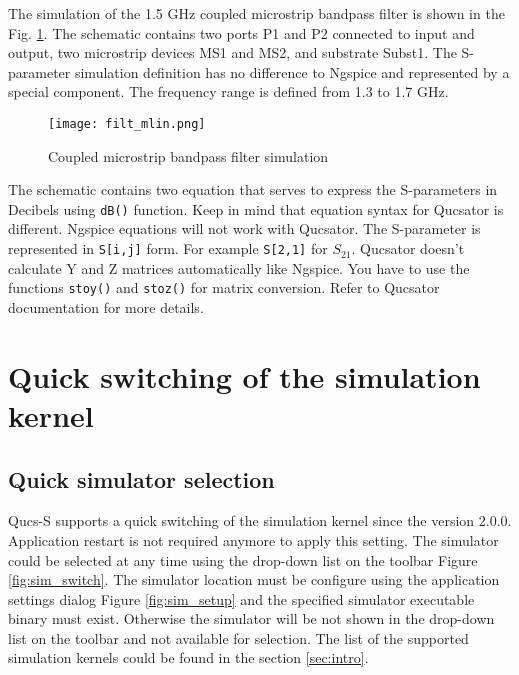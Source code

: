 The simulation of the 1.5 GHz coupled microstrip bandpass filter is shown in the Fig. \ref{fig:mlin}. The schematic contains two ports P1 and P2 connected to input and output, two microstrip devices MS1 and MS2, and substrate Subst1. The S-parameter simulation definition has no difference to Ngspice and represented by a special component. The frequency range is defined from 1.3 to 1.7 GHz.

    \begin{figure}[!ht]
    \begin{center}
        \texttt{[image: filt\_mlin.png]}
    \end{center}
    \caption{Coupled microstrip bandpass filter simulation} \label{fig:mlin}
    \end{figure}

The schematic contains two equation that serves to express the S-parameters in Decibels using \verb|dB()| function. Keep in mind that equation syntax for Qucsator is different. Ngspice equations will not work with Qucsator. The S-parameter is represented in \verb|S[i,j]| form. For example \verb|S[2,1]| for $S_{21}$. Qucsator doesn't calculate Y and Z matrices automatically like Ngspice. You have to use the functions \verb|stoy()| and \verb|stoz()| for matrix conversion. Refer to Qucsator documentation for more details.

\section{Quick switching of the simulation kernel} \label{sec:quick_sw}

\subsection{Quick simulator selection}

Qucs-S supports a quick switching of the simulation kernel since the version 2.0.0. Application restart is not required anymore to apply this setting. The simulator could be selected at any time using the drop-down list on the toolbar Figure \ref{fig:sim_switch}. The simulator location must be configure using the application settings dialog Figure \ref{fig:sim_setup} and the specified simulator executable binary must exist. Otherwise the simulator will be not shown in the drop-down list on the toolbar and not available for selection. The list of the supported simulation kernels could be found in the section \ref{sec:intro}.

